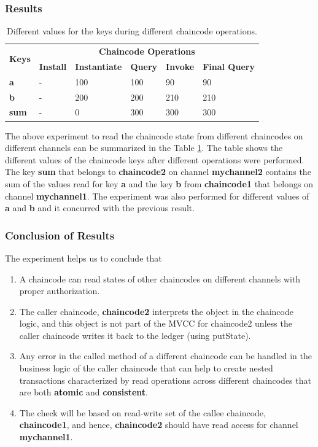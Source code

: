 \documentclass[
  a4paper,  %
  twoside,  %
  bibliography=totoc,
  headsepline,
  cleardoublepage=empty,
  parskip=half,
  draft=false
]{scrbook}
\begin{document}
\subsubsection{Results}
\begin{table}[h!]
\begin{center}
    \begin{tabular}{ |l|l|l|l|l|l|}
    \hline
    \multirow{2}{*}{\textbf{Keys}} & \multicolumn{5}{c|}{\textbf{Chaincode Operations}}\\ \cline{2-6}
    &\textbf{Install}& \textbf{Instantiate}& \textbf{Query}& \textbf{Invoke}& \textbf{Final Query} \\ \hline
    \textbf{a} & - & 100 & 100 & 90 & 90 \\ \hline
    \textbf{b} & - & 200 & 200 & 210 & 210 \\ \hline
    \textbf{sum} & - & 0 & 300 & 300 & 300 \\ \hline
    \end{tabular}
\end{center}
\caption{Different values for the keys during different chaincode operations.}
    \label{tab:result12}
\end{table}
The above experiment to read the chaincode state from different chaincodes on different channels can be summarized in the Table \ref{tab:result12}. The table shows the different values of the chaincode keys after different operations were performed. The key \textbf{sum} that belongs to \textbf{chaincode2} on channel \textbf{mychannel2} contains the sum of the values read for key \textbf{a} and the key \textbf{b} from \textbf{chaincode1} that belongs on channel \textbf{mychannel1}. The experiment was also performed for different values of \textbf{a} and \textbf{b} and it concurred with the previous result.

\subsubsection{Conclusion of Results}
The experiment helps us to conclude that 
\begin{enumerate}
    \item A chaincode can read states of other chaincodes on different channels with proper authorization.
    \item The caller chaincode, \textbf{chaincode2} interprets the object in the chaincode logic, and this object is not part of the MVCC for chaincode2 unless the caller chaincode writes it back to the ledger (using putState). 
    \item Any error in the called method of a different chaincode can be handled in the business logic of the caller chaincode that can help to create nested transactions characterized by read operations across different chaincodes that are both \textbf{atomic} and \textbf{consistent}.
    \item The check will be based on read-write set of the callee chaincode, \textbf{chaincode1}, and hence, \textbf{chaincode2} should have read access for channel \textbf{mychannel1}.  
\end{enumerate} 
\end{document}
